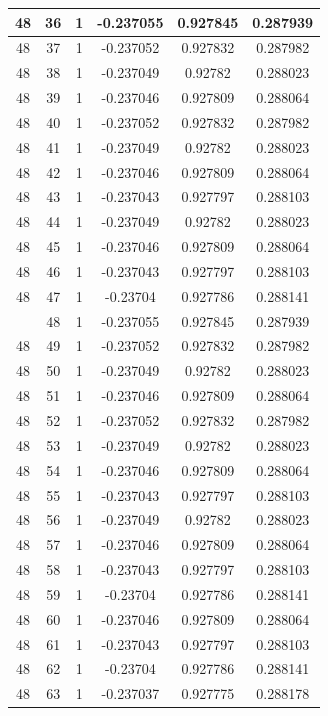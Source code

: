 \documentclass[12pt,a4paper]{article}
\numberwithin{equation}{section}
\numberwithin{figure}{section}
\numberwithin{table}{section}
\begin{document}
\begin{longtable}{|c|c|c|c|c|c|}
48 & 36 & 1 & -0.237055 & 0.927845 & 0.287939 \\ \hline
48 & 37 & 1 & -0.237052 & 0.927832 & 0.287982 \\ \hline
48 & 38 & 1 & -0.237049 & 0.92782 & 0.288023 \\ \hline
48 & 39 & 1 & -0.237046 & 0.927809 & 0.288064 \\ \hline
48 & 40 & 1 & -0.237052 & 0.927832 & 0.287982 \\ \hline
48 & 41 & 1 & -0.237049 & 0.92782 & 0.288023 \\ \hline
48 & 42 & 1 & -0.237046 & 0.927809 & 0.288064 \\ \hline
48 & 43 & 1 & -0.237043 & 0.927797 & 0.288103 \\ \hline
48 & 44 & 1 & -0.237049 & 0.92782 & 0.288023 \\ \hline
48 & 45 & 1 & -0.237046 & 0.927809 & 0.288064 \\ \hline
48 & 46 & 1 & -0.237043 & 0.927797 & 0.288103 \\ \hline
48 & 47 & 1 & -0.23704 & 0.927786 & 0.288141 \\ \hline
\pagebreak
48 & 48 & 1 & -0.237055 & 0.927845 & 0.287939 \\ \hline
48 & 49 & 1 & -0.237052 & 0.927832 & 0.287982 \\ \hline
48 & 50 & 1 & -0.237049 & 0.92782 & 0.288023 \\ \hline
48 & 51 & 1 & -0.237046 & 0.927809 & 0.288064 \\ \hline
48 & 52 & 1 & -0.237052 & 0.927832 & 0.287982 \\ \hline
48 & 53 & 1 & -0.237049 & 0.92782 & 0.288023 \\ \hline
48 & 54 & 1 & -0.237046 & 0.927809 & 0.288064 \\ \hline
48 & 55 & 1 & -0.237043 & 0.927797 & 0.288103 \\ \hline
48 & 56 & 1 & -0.237049 & 0.92782 & 0.288023 \\ \hline
48 & 57 & 1 & -0.237046 & 0.927809 & 0.288064 \\ \hline
48 & 58 & 1 & -0.237043 & 0.927797 & 0.288103 \\ \hline
48 & 59 & 1 & -0.23704 & 0.927786 & 0.288141 \\ \hline
48 & 60 & 1 & -0.237046 & 0.927809 & 0.288064 \\ \hline
48 & 61 & 1 & -0.237043 & 0.927797 & 0.288103 \\ \hline
48 & 62 & 1 & -0.23704 & 0.927786 & 0.288141 \\ \hline
48 & 63 & 1 & -0.237037 & 0.927775 & 0.288178 \\ \hline

\end{longtable}
\end{document}
